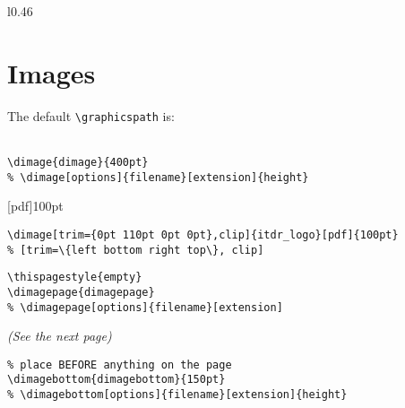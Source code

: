 \documentclass[itdr]{subfiles}
\begin{document}
\skipline
\lipsum[4]

\begin{wrap}[15]{l}{0.46\linewidth}
\end{wrap}

\skipline
\lipsum[5]

\vfill
\cleartoleftpage


\section{Images}


\break

The default \lstinline!\graphicspath! is:\\
\\

\vspace{-0.5ex}
\begin{lstlisting}
\dimage{dimage}{400pt}
% \dimage[options]{filename}[extension]{height}
\end{lstlisting}
\faHandPointLeft

\vfill

[pdf]{100pt}
\faHandPointUp
\begin{lstlisting}
\dimage[trim={0pt 110pt 0pt 0pt},clip]{itdr_logo}[pdf]{100pt}
% [trim=\{left bottom right top\}, clip]
\end{lstlisting}

\vfill

\begin{lstlisting}
\thispagestyle{empty}
\dimagepage{dimagepage}
% \dimagepage[options]{filename}[extension]
\end{lstlisting}
{\em (See the next page)}\hfill\faHandPointRight

\vfill

\begin{lstlisting}
% place BEFORE anything on the page
\dimagebottom{dimagebottom}{150pt}
% \dimagebottom[options]{filename}[extension]{height}
\end{lstlisting}
\faHandPointDown
\vspace{-3.5ex}

\break

\thispagestyle{empty}
\end{document}
